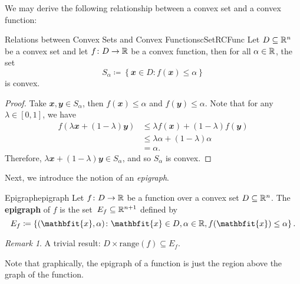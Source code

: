 \documentclass[math, code]{amznotes}
\theoremstyle{remark}
\newtheorem*{remark}{Remark}
\begin{document}
We may derive the following relationship between a convex set and a convex function:
\begin{probox}{Relations between Convex Sets and Convex Functions}{cSetRCFunc}
    Let $D \subseteq \mathbb{R}^n$ be a convex set and let $f \colon D \to \mathbb{R}$ be a convex function, then for all $\alpha \in \mathbb{R}$, the set
    \begin{displaymath}
        S_\alpha \coloneqq \left\{\mathbfit{x} \in D \colon f(\mathbfit{x}) \leq \alpha\right\}
    \end{displaymath}
    is convex.
    \tcblower   
    \begin{proof}
        Take $\mathbfit{x}, \mathbfit{y} \in S_\alpha$, then $f(\mathbfit{x}) \leq \alpha$ and $f(\mathbfit{y}) \leq \alpha$. Note that for any $\lambda \in [0, 1]$, we have
        \begin{align*}
            f\left(\lambda\mathbfit{x} + (1 - \lambda)\mathbfit{y}\right) & \leq \lambda f(\mathbfit{x}) + (1 - \lambda)f(\mathbfit{y}) \\
            & \leq \lambda\alpha + (1 - \lambda)\alpha \\
            & = \alpha.
        \end{align*}
        Therefore, $\lambda\mathbfit{x} + (1 - \lambda)\mathbfit{y} \in S_\alpha$, and so $S_\alpha$ is convex.
    \end{proof}
\end{probox}
Next, we introduce the notion of an \textit{epigraph}.
\begin{dfnbox}{Epigraph}{epigraph}
    Let $f \colon D \to \mathbb{R}$ be a function over a convex set $D \subseteq \mathbb{R}^n$. The {\color{red} \textbf{epigraph}} of $f$ is the set~$E_f \subseteq \mathbb{R}^{n + 1}$ defined by
    \begin{displaymath}
        E_f \coloneqq \left\{(\mathbfit{x}, \alpha) \colon \mathbfit{x} \in D, \alpha \in \R, f(\mathbfit{x}) \leq \alpha\right\}.
    \end{displaymath}
\end{dfnbox}
\begin{notebox}
    \begin{remark}
        A trivial result: $D \times \mathrm{range}(f) \subseteq E_f$.
    \end{remark}
\end{notebox}
Note that graphically, the epigraph of a function is just the region above the graph of the function.
\end{document}
